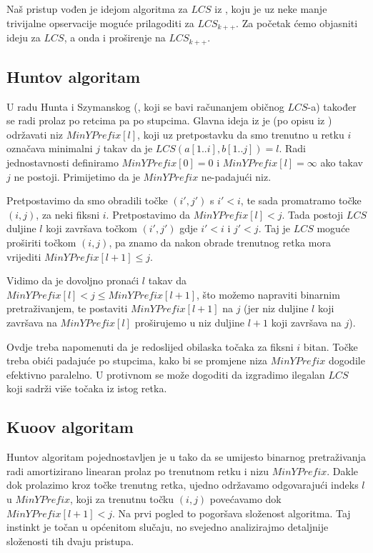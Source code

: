 \documentclass[times, utf8, seminar, numeric]{fer}
\begin{document}
Naš pristup vođen je idejom algoritma za $LCS$ iz \cite{Hunt}, koju je uz neke
manje trivijalne opservacije moguće prilagoditi za $LCS_{k++}$. Za početak
ćemo objasniti ideju za $LCS$, a onda i proširenje na $LCS_{k++}$.

\subsection{Huntov algoritam}
U radu Hunta i Szymanskog (\cite{Hunt}, koji se bavi računanjem
običnog $LCS$-a) također se radi prolaz po retcima pa po
stupcima. Glavna ideja iz je (po opisu iz \cite{Survey}) održavati niz
$MinYPrefix[l]$, koji uz pretpostavku da smo trenutno u retku $i$
označava minimalni $j$ takav da je $LCS(a[1..i], b[1..j]) = l$. Radi
jednostavnosti definiramo $MinYPrefix[0] = 0$ i $MinYPrefix[l] =
\infty$ ako takav $j$ ne postoji.  Primijetimo da je $MinYPrefix$
ne-padajući niz.

Pretpostavimo da smo obradili točke $(i', j')$ s $i' < i$, te sada
promatramo točke $(i, j)$, za neki fiksni $i$. Pretpostavimo da
$MinYPrefix[l] < j$.  Tada postoji $LCS$ duljine $l$ koji završava točkom
$(i', j')$ gdje $i' < i$ i $j' < j$. Taj je $LCS$ moguće proširiti točkom
$(i, j)$, pa znamo da nakon obrade trenutnog retka mora vrijediti
$MinYPrefix[l+1] \le j$.  

Vidimo da je dovoljno pronaći $l$ takav da $MinYPrefix[l] < j \le
MinYPrefix[l+1]$, što možemo napraviti binarnim pretraživanjem, te
postaviti $MinYPrefix[l+1]$ na $j$ (jer niz duljine $l$ koji završava
na $MinYPrefix[l]$ proširujemo u niz duljine $l+1$ koji završava na
$j$).

Ovdje treba napomenuti da je redoslijed obilaska točaka za fiksni $i$
bitan. Točke treba obići padajuće po stupcima, kako bi se promjene
niza $MinYPrefix$ dogodile efektivno paralelno. U protivnom se može
dogoditi da izgradimo ilegalan $LCS$ koji sadrži više točaka iz
istog retka.

\subsection{Kuoov algoritam}
Huntov algoritam pojednostavljen je u \cite{Kuo} tako da se umijesto
binarnog pretraživanja radi amortizirano linearan prolaz po trenutnom
retku i nizu $MinYPrefix$. Dakle dok prolazimo kroz točke trenutng 
retka, ujedno održavamo odgovarajući indeks $l$ u $MinYPrefix$, koji
za trenutnu točku $(i, j)$ povećavamo dok $MinYPrefix[l+1] < j$. 
Na prvi pogled to pogoršava složenost algoritma. Taj instinkt je
točan u općenitom slučaju, no svejedno analizirajmo detaljnije
složenosti tih dvaju pristupa.
\end{document}
